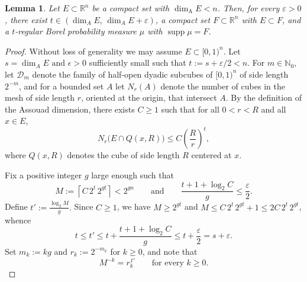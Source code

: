 \documentclass[12pt]{amsart}
\newtheorem{lemma}[theorem]{Lemma}
\theoremstyle{definition}
\theoremstyle{remark}
\numberwithin{equation}{section}
\begin{document}
\begin{lemma}\label{Assouad Lemma}
Let $E \subset \mathbb{R}^n$ be a compact set with $\dim_{\mathrm A} E < n$.
Then, for every $\varepsilon>0$, there exist
$t\in(\dim_A E,\, \dim_A E+\varepsilon)$, a compact set
$F\subset\mathbb{R}^n$ with $E\subset F$, and a $t$-regular Borel
probability measure $\mu$ with $\operatorname{supp}\mu=F$.
\end{lemma}


\begin{proof}
Without loss of generality we may assume $E \subset [0,1)^n$. Let $s=\dim_A E\text{ and } \epsilon>0$ sufficiently small such that
$t:=s+\varepsilon/2<n$. For $m\in\mathbb{N}_0$, let $\mathcal{D}_m$ denote
the family of half-open dyadic subcubes of $[0,1)^n$ of side length
$2^{-m}$, and for a bounded set $A$ let $N_r(A)$ denote the number of
cubes in the mesh of side length $r$, oriented at the origin, that
intersect $A$. By the definition of the Assouad dimension, there exists
$C\geq 1$ such that for all $0<r<R$ and all $x\in E$,
\begin{equation}\label{eq:assouad_bound}
N_r\bigl(E \cap Q(x,R)\bigr)
\le C \left(\frac{R}{r}\right)^{t},
\end{equation}
where $Q(x,R)$ denotes the cube of side length $R$ centered at $x$.

Fix a positive integer $g$ large enough such that
\begin{equation}\label{def:gap}
    M := \left\lceil C\,2^{t}\,2^{gt} \right\rceil < 2^{gn}
    \qquad\text{and}\qquad
    \frac{t+1+\log_2 C}{g}\leq \frac{\varepsilon}{2}.
\end{equation}
Define $t':=\frac{\log_2 M}{g}.$ Since $C\geq 1$, we have $M\geq 2^{gt}$ and
$M\leq C\,2^t\,2^{gt}+1\leq 2C\,2^t\,2^{gt}$, whence
$$t\leq t'\leq t+\frac{t+1+\log_2 C}{g}\leq t+\frac{\varepsilon}{2}
=s+\varepsilon.$$
Set $m_k:=kg$ and $r_k:=2^{-m_k}$ for $k\geq 0$, and note that
\begin{equation}\label{eq:exact_scaling}
    M^{-k}=r_k^{\,t'}\qquad\text{for every }k\geq 0.
\end{equation}


\end{proof}
\end{document}
